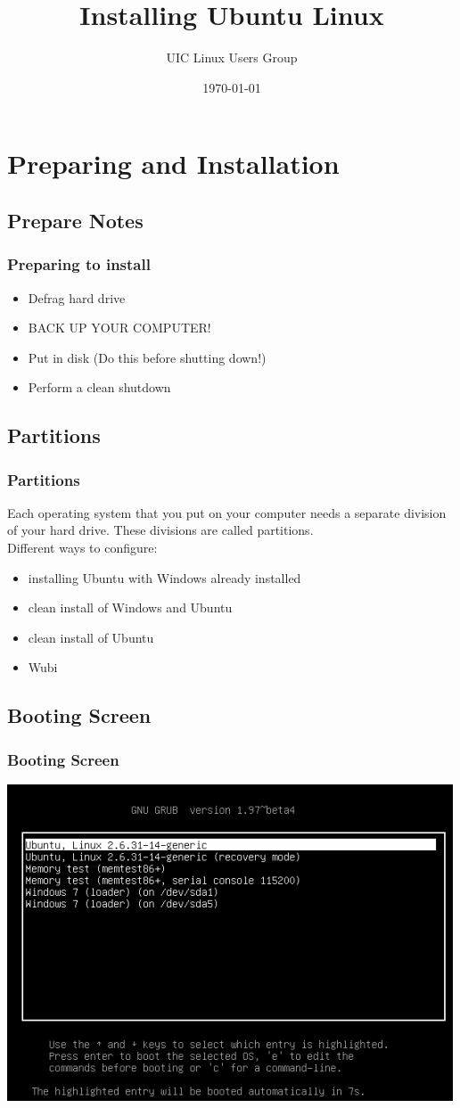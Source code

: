 \documentclass[hyperref={pdfpagelabels=false}]{beamer}
\title{Installing Ubuntu Linux}
\author{UIC Linux Users Group}
\date{\today}
\begin{document}
\frame{\titlepage}
\section{Preparing and Installation}
\subsection{Prepare Notes}
\frame
{
    \frametitle{Preparing to install}
    \begin{itemize}
    \item{Defrag hard drive}
	\item{BACK UP YOUR COMPUTER!}
	\item{Put in disk (Do this before shutting down!)}
    \item{Perform a clean shutdown}
    \end{itemize}
}
\subsection{Partitions}
\frame
{
	\frametitle{Partitions}
	Each operating system that you put on your computer needs a separate division of your hard drive. These divisions are called partitions.\\
	Different ways to configure:
	\begin{itemize}
	\item{installing Ubuntu with Windows already installed}
	\item{clean install of Windows and Ubuntu}
	\item{clean install of Ubuntu}
	\item{Wubi}
	\end{itemize}
}
\subsection{Booting Screen}
\frame
{
	\frametitle{Booting Screen}
    \includegraphics[totalheight=0.8\textheight]{grub.png}
}
\end{document}
